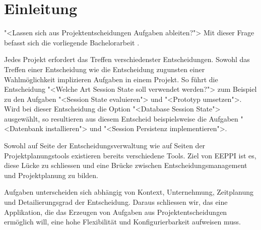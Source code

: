 \chapter{Einleitung}

	"<Lassen sich aus Projektentscheidungen Aufgaben ableiten?">
	Mit dieser Frage befasst sich die vorliegende Bachelorarbeit \eeppi.
		
	Jedes Projekt erfordert das Treffen verschiedenster Entscheidungen.
	Sowohl das Treffen einer Entscheidung wie die Entscheidung zugunsten einer Wahlmöglichkeit implizieren Aufgaben in einem Projekt.
	So führt die Entscheidung "<Welche Art Session State soll verwendet werden?"> zum Beispiel zu den Aufgaben
	"<Session State evaluieren"> und "<Prototyp umsetzen">.		
	Wird bei dieser Entscheidung die Option "<Database Session State"> ausgewählt,
	so resultieren aus diesem Entscheid beispielsweise die Aufgaben "<Datenbank installieren"> und
		"<Session Persistenz implementieren">.
	
	Sowohl auf Seite der Entscheidungsverwaltung wie auf Seiten der Projektplanungstools existieren bereits verschiedene Tools.
	Ziel von EEPPI ist es, diese Lücke zu schliessen und eine Brücke zwischen Entscheidungsmanagement und Projektplanung zu bilden.
	
	Aufgaben unterscheiden sich abhängig von Kontext, Unternehmung, Zeitplanung und Detailierungsgrad der Entscheidung.
	Daraus schliessen wir, das eine Applikation, die das Erzeugen von Aufgaben aus Projektentscheidungen ermöglich will, eine hohe Flexibilität und Konfigurierbarkeit aufweisen muss.
	
